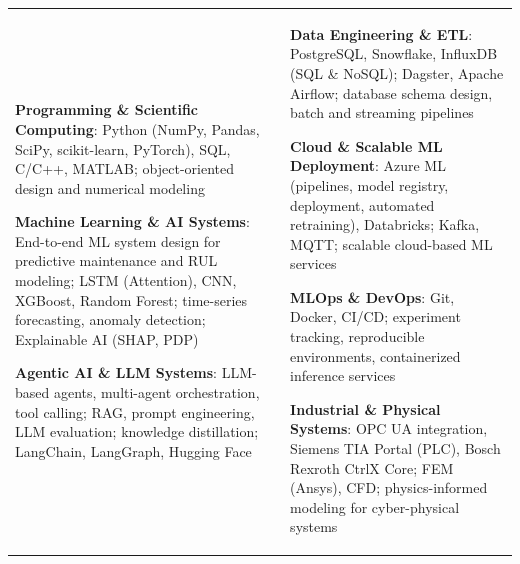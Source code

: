 {\scriptsize
\begin{tabularx}{\textwidth}{@{}X X@{}}

\begin{minipage}[t]{\linewidth}

\textbf{\textcolor{linksoft}{Programming \& Scientific Computing}}: 
Python (NumPy, Pandas, SciPy, scikit-learn, PyTorch), SQL, C/C++, MATLAB; 
object-oriented design and numerical modeling 
\par\vspace{0.5em}

\textbf{\textcolor{linksoft}{Machine Learning \& AI Systems}}: 
End-to-end ML system design for predictive maintenance and RUL modeling; 
LSTM (Attention), CNN, XGBoost, Random Forest; 
time-series forecasting, anomaly detection; 
Explainable AI (SHAP, PDP) 
\par\vspace{0.5em}

\textbf{\textcolor{linksoft}{Agentic AI \& LLM Systems}}: 
LLM-based agents, multi-agent orchestration, tool calling; 
RAG, prompt engineering, LLM evaluation; 
knowledge distillation; LangChain, LangGraph, Hugging Face 

\end{minipage}
&
\begin{minipage}[t]{\linewidth}

\textbf{\textcolor{linksoft}{Data Engineering \& ETL}}: 
PostgreSQL, Snowflake, InfluxDB (SQL \& NoSQL); 
Dagster, Apache Airflow; 
database schema design, batch and streaming pipelines
\par\vspace{0.5em}

\textbf{\textcolor{linksoft}{Cloud \& Scalable ML Deployment}}: 
Azure ML (pipelines, model registry, deployment, automated retraining), 
Databricks; Kafka, MQTT; scalable cloud-based ML services 
\par\vspace{0.5em}

\textbf{\textcolor{linksoft}{MLOps \& DevOps}}: 
Git, Docker, CI/CD; experiment tracking, 
reproducible environments, containerized inference services 
\par\vspace{0.5em}

\textbf{\textcolor{linksoft}{Industrial \& Physical Systems}}: 
OPC UA integration, Siemens TIA Portal (PLC), 
Bosch Rexroth CtrlX Core; 
FEM (Ansys), CFD; physics-informed modeling 
for cyber-physical systems

\end{minipage}
\\
\end{tabularx}
}
